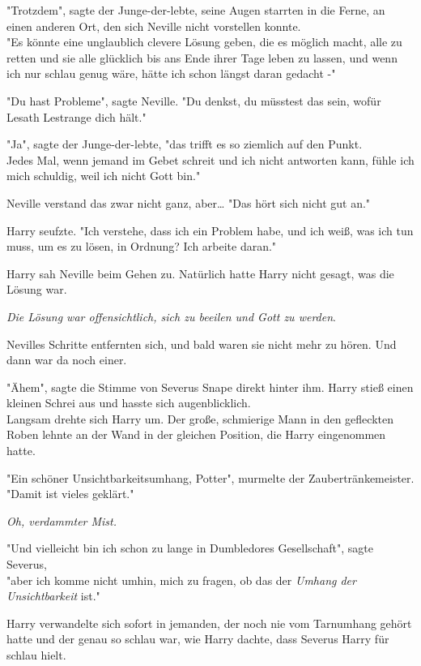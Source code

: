 {"Trotzdem", sagte der Junge-der-lebte, seine Augen starrten in die Ferne, an einen anderen Ort, den sich Neville nicht vorstellen konnte.\\ "Es könnte eine unglaublich clevere Lösung geben, die es möglich macht, alle zu retten und sie alle glücklich bis ans Ende ihrer Tage leben zu lassen, und wenn ich nur schlau genug wäre, hätte ich schon längst daran gedacht -"

"Du hast Probleme", sagte Neville. "Du denkst, du müsstest das sein, wofür Lesath Lestrange dich hält."

"Ja", sagte der Junge-der-lebte, "das trifft es so ziemlich auf den Punkt.\\ Jedes Mal, wenn jemand im Gebet schreit und ich nicht antworten kann, fühle ich mich schuldig, weil ich nicht Gott bin."

Neville verstand das zwar nicht ganz, aber… "Das hört sich nicht gut an."

Harry seufzte. "Ich verstehe, dass ich ein Problem habe, und ich weiß, was ich tun muss, um es zu lösen, in Ordnung? Ich arbeite daran."

Harry sah Neville beim Gehen zu. Natürlich hatte Harry nicht gesagt, was die Lösung war.

\emph{Die Lösung war offensichtlich, sich zu beeilen und Gott zu werden}.

Nevilles Schritte entfernten sich, und bald waren sie nicht mehr zu hören. Und dann war da noch einer.

"Ähem", sagte die Stimme von Severus Snape direkt hinter ihm. Harry stieß einen kleinen Schrei aus und hasste sich augenblicklich.\\ Langsam drehte sich Harry um. Der große, schmierige Mann in den gefleckten Roben lehnte an der Wand in der gleichen Position, die Harry eingenommen hatte.

"Ein schöner Unsichtbarkeitsumhang, Potter", murmelte der Zaubertränkemeister.\\ "Damit ist vieles geklärt."

\emph{Oh, verdammter Mist.}

"Und vielleicht bin ich schon zu lange in Dumbledores Gesellschaft", sagte Severus,\\ "aber ich komme nicht umhin, mich zu fragen, ob das der \emph{Umhang der Unsichtbarkeit} ist."

Harry verwandelte sich sofort in jemanden, der noch nie vom Tarnumhang gehört hatte und der genau so schlau war, wie Harry dachte, dass Severus Harry für schlau hielt.

}
